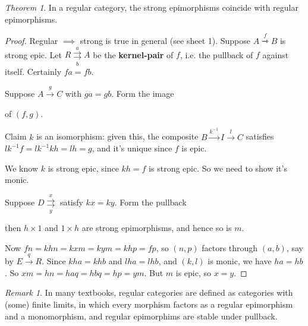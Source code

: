 \documentclass[a4paper]{article}
\theoremstyle{definition}
\theoremstyle{remark}
\newtheorem{remark}[definition]{Remark}
\theoremstyle{default}
\newtheorem{theorem}[definition]{Theorem}
\numberwithin{definition}{section}
\newcommand*\parallelpair[2]{\overset{#1}{\underset{#2}{\rightrightarrows}}}
\begin{document}
\begin{theorem}
	In a regular category, the strong epimorphisms coincide with regular epimorphisms.
	\label{65}
\end{theorem}
\begin{proof}
	Regular $\implies$ strong is true in general (see sheet 1).
	Suppose $A \overset{f}{\rightarrowtriangle} B$ is strong epic.
	Let $R \parallelpair{a}{b} A$ be the \textbf{kernel-pair} of $f$,
	i.e. the pullback of $f$ against itself. Certainly $fa = fb$.
	
	Suppose $A \overset{g}{\to} C$ with $ga = gb$. Form the image
	\begin{center}
	\end{center}
	of $(f, g)$.
	
	Claim $k$ is an isomorphism: given this,
	the composite $B \overset{k^{-1}}{\to} I \overset{l}{\to} C$ satisfies $lk^{-1}f = lk^{-1}kh = lh = g$,
	and it's unique since $f$ is epic.
	
	We know $k$ is strong epic, since $kh=f$ is strong epic.
	So we need to show it's monic.
	
	Suppose $D \parallelpair{x}{y}$ satisfy $kx=ky$. Form the pullback
	\begin{center}
	\end{center}
	then $h \times 1$ and $1 \times h$ are strong epimorphisms, and hence so is $m$.
	
	Now $fn = khn = kxm = kym = khp = fp$, 
	so $(n,p)$ factors through $(a, b)$,
	say by $E \overset{q}{\to} R$.
	Since $kha = khb$ and $lha = lhb$, and $(k, l)$ is monic, 
	we have $ha = hb$.
	So $xm = hn = haq = hbq = hp = ym$.
	But $m$ is epic, so $x=y$.
\end{proof}
\begin{remark}
	In many textbooks, regular categories are defined as categories with (some) finite limits,
	in which every morphism factors as a regular epimorphism and a monomorphism,
	and regular epimorphims are stable under pullback.
\end{remark}
\end{document}
